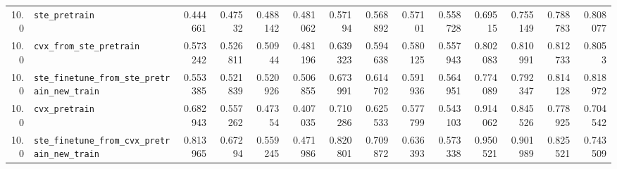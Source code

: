 \begin{longtable}{@{}r l *{12}{r}@{}}
10.0 & \texttt{ste\_pretrain} & 0.444661 & 0.47532 & 0.488142 & 0.481062 & 0.57194 & 0.568892 & 0.57101 & 0.558728 & 0.69515 & 0.755149 & 0.788783 & 0.808077 \\
10.0 & \texttt{cvx\_from\_ste\_pretrain} & 0.573242 & 0.526811 & 0.50944 & 0.481196 & 0.639323 & 0.594638 & 0.580125 & 0.557943 & 0.802083 & 0.810991 & 0.812733 & 0.8053 \\
10.0 & \texttt{ste\_finetune\_from\_ste\_pretrain\_new\_train} & 0.553385 & 0.521839 & 0.520926 & 0.506855 & 0.673991 & 0.614702 & 0.591936 & 0.564951 & 0.774089 & 0.792347 & 0.814128 & 0.818972 \\
10.0 & \texttt{cvx\_pretrain} & 0.682943 & 0.557262 & 0.47354 & 0.407035 & 0.710286 & 0.625533 & 0.577799 & 0.543103 & 0.914062 & 0.845526 & 0.778925 & 0.704542 \\
10.0 & \texttt{ste\_finetune\_from\_cvx\_pretrain\_new\_train} & 0.813965 & 0.67294 & 0.559245 & 0.471986 & 0.820801 & 0.709872 & 0.636393 & 0.573338 & 0.950521 & 0.901989 & 0.825521 & 0.743509 \\
\end{longtable}
